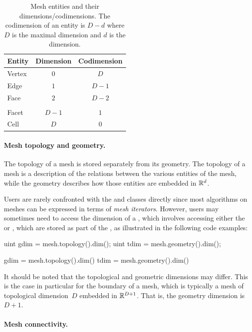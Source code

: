 \begin{table}
  \centering
  \begin{tabular}{lcc}
    \toprule
    Entity & Dimension & Codimension \\
    \hline
    Vertex & $0$ & $D$ \\
    Edge & $1$ & $D-1$ \\
    Face & $2$ & $D-2$ \\
    & & \\
    Facet & $D-1$ & $1$ \\
    Cell & $D$ & $0$ \\
    \bottomrule
    \end{tabular}
  \caption{Mesh entities and their dimensions/codimensions. The
    codimension of an entity is $D - d$ where $D$ is the maximal
    dimension and $d$ is the dimension.}
  \label{tab:logg-2:entities}
\end{table}

\paragraph{Mesh topology and geometry.}

The topology of a mesh is stored separately from its geometry. The
topology of a mesh is a description of the relations between the
various entities of the mesh, while the geometry describes how those
entities are embedded in $\mathbb{R}^d$.

Users are rarely confronted with the  and
 classes directly since most algorithms on meshes can be
expressed in terms of \emph{mesh iterators}. However, users may sometimes
need to access the dimension of a , which involves accessing
either the  or , which are stored
as part of the , as illustrated in the following code examples:
\begin{c++}
uint gdim = mesh.topology().dim();
uint tdim = mesh.geometry().dim();
\end{c++}
\begin{python}
gdim = mesh.topology().dim()
tdim = mesh.geometry().dim()
\end{python}
It should be noted that the topological and geometric dimensions may
differ. This is the case in particular for the boundary of a mesh,
which is typically a mesh of topological dimension~$D$ embedded in
$\mathbb{R}^{D+1}$. That is, the geometry dimension is~$D + 1$.

\paragraph{Mesh connectivity.}

